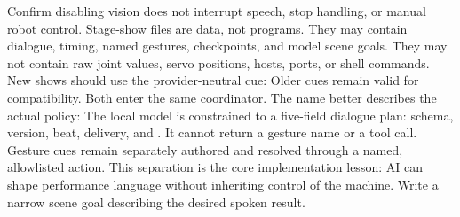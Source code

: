 Confirm disabling vision does not interrupt speech, stop handling, or\markdownRendererSoftLineBreak
{}manual robot control.\markdownRendererOlItemEnd 
\markdownRendererOlEnd \markdownRendererInterblockSeparator
{}\markdownRendererThematicBreak{}\markdownRendererInterblockSeparator
{}
\markdownRendererSectionEnd 
\markdownRendererSectionEnd \markdownRendererSectionBegin
{}\markdownRendererInterblockSeparator
{}Stage-show files are data, not programs. They may contain dialogue, timing,\markdownRendererSoftLineBreak
{}named gestures, checkpoints, and model scene goals. They may not contain raw\markdownRendererSoftLineBreak
{}joint values, servo positions, hosts, ports, or shell commands.\markdownRendererParagraphSeparator
{}New shows should use the provider-neutral  cue:\markdownRendererInterblockSeparator
{}\markdownRendererInterblockSeparator
{}Older  cues remain valid for compatibility. Both enter the same\markdownRendererSoftLineBreak
{}coordinator. The name  better describes the actual policy:\markdownRendererInterblockSeparator
{}\markdownRendererInterblockSeparator
{}The local model is constrained to a five-field dialogue plan: schema, version,\markdownRendererSoftLineBreak
{}beat, delivery, and . It cannot return a gesture name or a tool\markdownRendererSoftLineBreak
{}call. Gesture cues remain separately authored and resolved through a named,\markdownRendererSoftLineBreak
{}allowlisted action. This separation is the core implementation lesson: AI can\markdownRendererSoftLineBreak
{}shape performance language without inheriting control of the machine.\markdownRendererInterblockSeparator
{}\markdownRendererSectionBegin
{}\markdownRendererInterblockSeparator
{}\markdownRendererOlBegin
{}Write a narrow scene goal describing the desired spoken result.\markdownRendererOlItemEnd 
